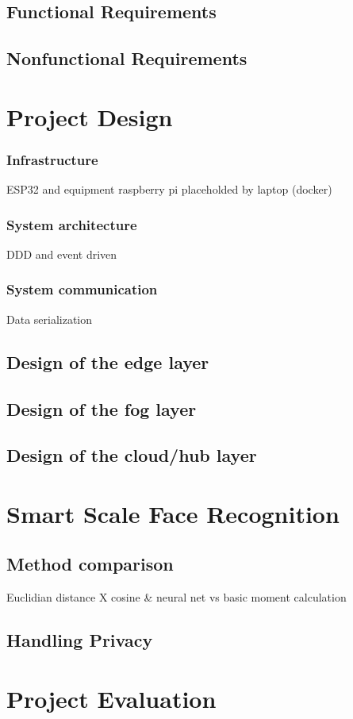 \documentclass[
12pt,        %
openright,   %
twoside,     %
a4paper,     %
brazil,       %
english       %
%
%
]{ppgca}
\begin{document}
\subsection{Functional Requirements}
\subsection{Nonfunctional Requirements}
\section{Project Design}
\subsubsection{Infrastructure}
ESP32 and equipment
raspberry pi placeholded by laptop (docker)
\subsubsection{System architecture}
DDD and event driven
\subsubsection{System communication}
Data serialization
\subsection{Design of the edge layer}
\subsection{Design of the fog layer}
\subsection{Design of the cloud/hub layer}
\section{Smart Scale Face Recognition}
\subsection{Method comparison}
Euclidian distance X cosine \& neural net vs basic moment calculation
\subsection{Handling Privacy}
\section{Project Evaluation}
\end{document}
